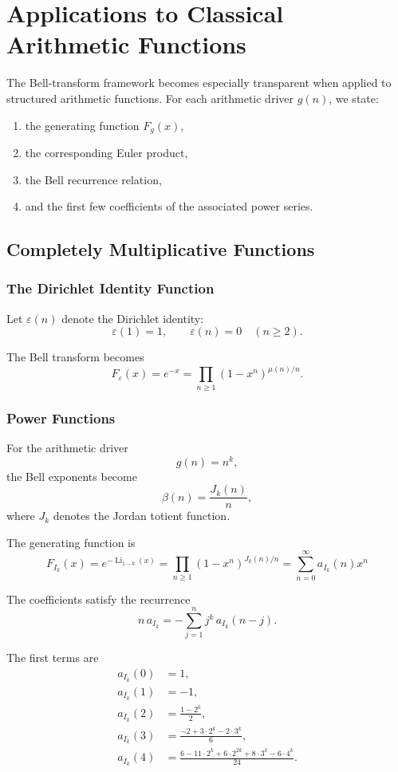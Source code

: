 \documentclass[11pt, a4paper]{article}
\theoremstyle{remark}
\DeclareMathOperator{\Li}{Li}
\begin{document}
\section{Applications to Classical Arithmetic Functions}

The Bell-transform framework becomes especially transparent when applied to structured arithmetic functions. 
For each arithmetic driver \(g(n)\), we state:

\begin{enumerate}
    \item the generating function \(F_g(x)\),
    \item the corresponding Euler product,
    \item the Bell recurrence relation,
    \item and the first few coefficients of the associated power series.
\end{enumerate}

\subsection{Completely Multiplicative Functions}

\subsubsection{The Dirichlet Identity Function}

Let \(\varepsilon(n)\) denote the Dirichlet identity:
\[
\varepsilon(1)=1,
\qquad
\varepsilon(n)=0
\quad(n\ge2).
\]

The Bell transform becomes
\[
F_\varepsilon(x)
=
e^{-x}
=
\prod_{n\ge1}
(1-x^n)^{\mu(n)/n}.
\]



\subsubsection{Power Functions}

For the arithmetic driver
\[
g(n)=n^k,
\]
the Bell exponents become
\[
\beta(n)=\frac{J_k(n)}{n},
\]
where \(J_k\) denotes the Jordan totient function.

The generating function is
\[
F_{I_k}(x)
=
e^{-\Li_{1-k}(x)}
=
\prod_{n\ge1}
(1-x^n)^{J_k(n)/n}=\sum_{n=0}^{\infty} a_{I_k}(n) x^n
\]

The coefficients satisfy the recurrence
\[
\boxed{
n\,a_{I_k}
=
-\sum_{j=1}^n
j^k\,a_{I_k}(n-j).
}
\]

The first terms are
\[
\begin{aligned}
a_{I_k}(0)&=1,\\
a_{I_k}(1)&=-1,\\
a_{I_k}(2)&=\frac{1-2^k}{2},\\
a_{I_k}(3)&=\frac{-2+3\cdot2^k-2\cdot3^k}{6},\\
a_{I_k}(4)&=
\frac{
6-11\cdot2^k+6\cdot2^{2k}
+8\cdot3^k-6\cdot4^k
}{24}.
\end{aligned}
\]
\end{document}
